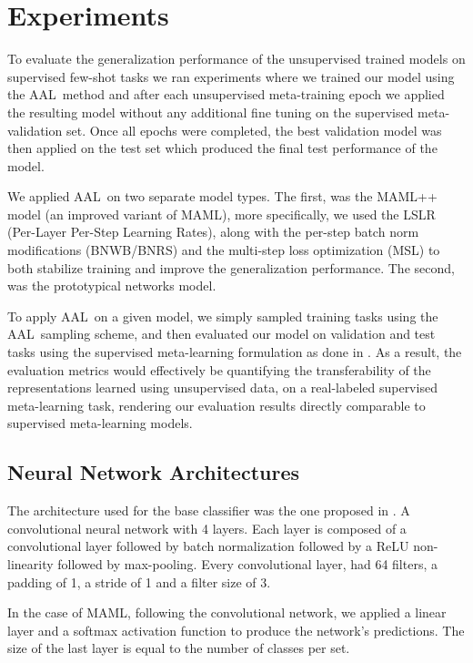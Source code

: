 \documentclass{article}
\newcommand{\untrain}{AAL}
\begin{document}
\section{Experiments}

To evaluate the generalization performance of the unsupervised trained models on supervised few-shot tasks we ran experiments where we trained our model using the \untrain\ method and after each unsupervised meta-training epoch we applied the resulting model without any additional fine tuning on the supervised meta-validation set. Once all epochs were completed, the best validation model was then applied on the test set which produced the final test performance of the model.

We applied \untrain\ on two separate model types. The first, was the MAML++ \cite{antoniou2018train} model (an improved variant of MAML), more specifically, we used the LSLR (Per-Layer Per-Step Learning Rates), along with the per-step batch norm modifications (BNWB/BNRS) and the multi-step loss optimization (MSL) to both stabilize training and improve the generalization performance. 
The second, was the prototypical networks \cite{snell2017prototypical} model. 

To apply \untrain\ on a given model, we simply sampled training tasks using the \untrain\ sampling scheme, and then evaluated our model on validation and test tasks using the supervised meta-learning formulation as done in \citet{finn2017model}. As a result, the evaluation metrics would effectively be quantifying the transferability of the representations learned using unsupervised data, on a real-labeled supervised meta-learning task, rendering our evaluation results directly comparable to supervised meta-learning models. 



\subsection{Neural Network Architectures}
The architecture used for the base classifier was the one proposed in \citet{finn2017model}. A convolutional neural network with 4 layers. Each layer is composed of a convolutional layer followed by batch normalization followed by a ReLU non-linearity followed by max-pooling. Every convolutional layer, had 64 filters, a padding of 1, a stride of 1 and a filter size of 3. 

In the case of MAML, following the convolutional network, we applied a linear layer and a softmax activation function to produce the network's predictions. The size of the last layer is equal to the number of classes per set.
\end{document}
